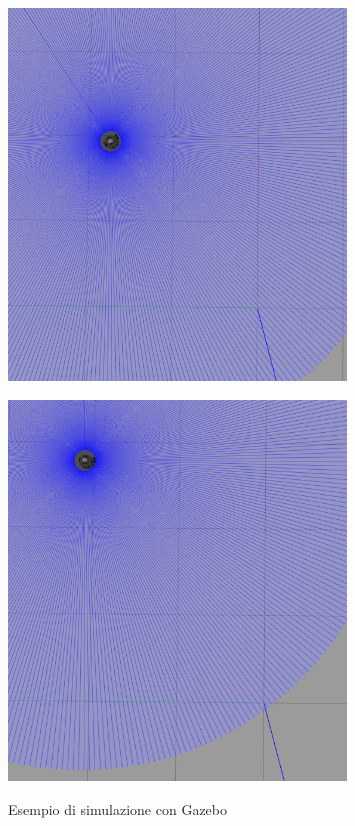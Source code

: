 \documentclass[a4paper,11 pt,oneside]{book}
\theoremstyle{definition}
\begin{document}
\begin{figure}[!htb]
    \centering
    \begin{minipage}{0.5\textwidth}
        \centering
        \includegraphics[width=0.8\textwidth, height=0.3\textheight]{frame3.png}
        \label{fig:prob1_6_2}
    \end{minipage}%
    \begin{minipage}{0.5\textwidth}
        \centering
        \includegraphics[width=0.8\textwidth, height=0.3\textheight]{frame4.png}
        \label{fig:prob1_6_1}
    \end{minipage}
    \label{esempio}
    \caption{Esempio di simulazione con Gazebo}
\end{figure}
\end{document}
